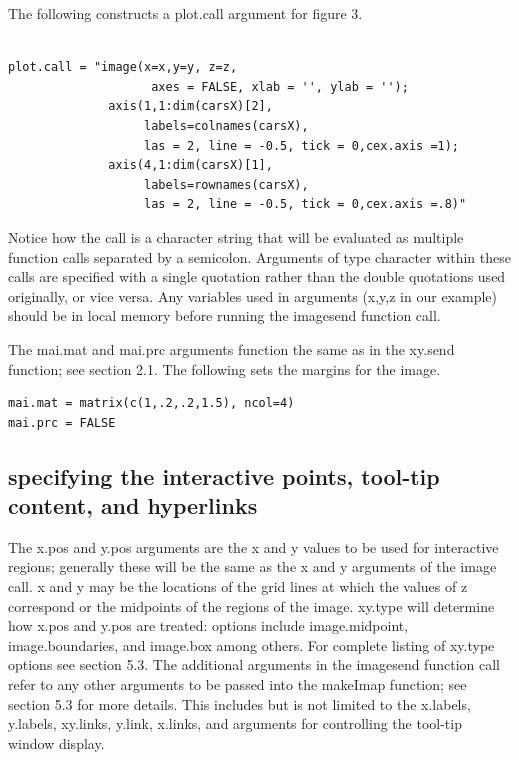 \documentclass[]{article}
\begin{document}
The following constructs a plot.call argument for figure 3. 

\begin{verbatim}

plot.call = "image(x=x,y=y, z=z,
                    axes = FALSE, xlab = '', ylab = '');
              axis(1,1:dim(carsX)[2], 
                   labels=colnames(carsX),
                   las = 2, line = -0.5, tick = 0,cex.axis =1); 
              axis(4,1:dim(carsX)[1], 
                   labels=rownames(carsX),
                   las = 2, line = -0.5, tick = 0,cex.axis =.8)"

\end{verbatim}


Notice how the call is a character string that will be evaluated as multiple function calls separated by a semicolon.  Arguments of type character within these calls are specified with a single quotation rather than the double quotations used originally, or vice versa. Any variables used in arguments (x,y,z in our example) should be in local memory before running the imagesend function call. \newline

\indent The mai.mat and mai.prc arguments function the same as in the xy.send function; see section 2.1.  The following sets the margins for the image. 

\begin{verbatim}
mai.mat = matrix(c(1,.2,.2,1.5), ncol=4)
mai.prc = FALSE
\end{verbatim}


\subsection{specifying the interactive points, tool-tip content, and hyperlinks}

\indent The x.pos and y.pos arguments are the x and y values to be used for interactive regions; generally these will be the same as the x and y arguments of the image call. x and y may be the locations of the grid lines at which the values of z correspond or the midpoints of the regions of the image. xy.type will determine how x.pos and y.pos are treated: options include image.midpoint, image.boundaries, and image.box among others. For complete listing of xy.type options see section 5.3. The additional arguments in the imagesend function call refer to any other arguments to be passed into the makeImap function; see section 5.3 for more details. This includes but is not limited to the x.labels, y.labels, xy.links, y.link, x.links, and arguments for controlling the tool-tip window display.
\end{document}
